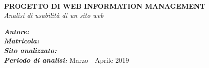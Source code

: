 \begin{titlepage}
	\HRule \\[0.4cm]
	{ \huge \bfseries PROGETTO DI WEB INFORMATION MANAGEMENT}\\[0.6cm] %
	{ \huge \emph{Analisi di usabilità di un sito web} }
	\HRule \\[1cm]
	
	
	\vspace{1cm}
	
	\begin{minipage}{0.5\textwidth}
		\begin{flushleft} 
			\center
			\emph{\bfseries Autore: }\nomeStudente\ \cognomeStudente\ \\
			\emph{\bfseries Matricola: }\matricolaStudente \\
			\emph{\bfseries Sito analizzato: } \textit{\linkSito} \\
			\emph{\bfseries Periodo di analisi: } Marzo - Aprile 2019
		\end{flushleft}
	\end{minipage}
	
\end{titlepage}

\tableofcontents
\newpage